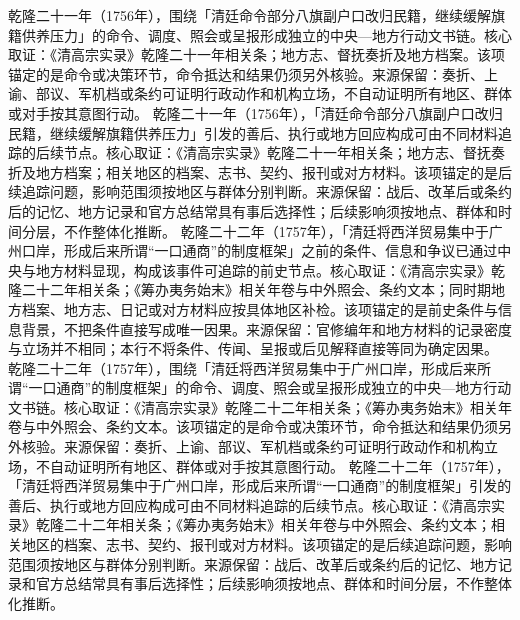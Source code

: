 乾隆二十一年（1756年），围绕「清廷命令部分八旗副户口改归民籍，继续缓解旗籍供养压力」的命令、调度、照会或呈报形成独立的中央—地方行动文书链。核心取证：《清高宗实录》乾隆二十一年相关条；地方志、督抚奏折及地方档案。该项锚定的是命令或决策环节，命令抵达和结果仍须另外核验。来源保留：奏折、上谕、部议、军机档或条约可证明行政动作和机构立场，不自动证明所有地区、群体或对手按其意图行动。
乾隆二十一年（1756年），「清廷命令部分八旗副户口改归民籍，继续缓解旗籍供养压力」引发的善后、执行或地方回应构成可由不同材料追踪的后续节点。核心取证：《清高宗实录》乾隆二十一年相关条；地方志、督抚奏折及地方档案；相关地区的档案、志书、契约、报刊或对方材料。该项锚定的是后续追踪问题，影响范围须按地区与群体分别判断。来源保留：战后、改革后或条约后的记忆、地方记录和官方总结常具有事后选择性；后续影响须按地点、群体和时间分层，不作整体化推断。
乾隆二十二年（1757年），「清廷将西洋贸易集中于广州口岸，形成后来所谓“一口通商”的制度框架」之前的条件、信息和争议已通过中央与地方材料显现，构成该事件可追踪的前史节点。核心取证：《清高宗实录》乾隆二十二年相关条；《筹办夷务始末》相关年卷与中外照会、条约文本；同时期地方档案、地方志、日记或对方材料应按具体地区补检。该项锚定的是前史条件与信息背景，不把条件直接写成唯一因果。来源保留：官修编年和地方材料的记录密度与立场并不相同；本行不将条件、传闻、呈报或后见解释直接等同为确定因果。
乾隆二十二年（1757年），围绕「清廷将西洋贸易集中于广州口岸，形成后来所谓“一口通商”的制度框架」的命令、调度、照会或呈报形成独立的中央—地方行动文书链。核心取证：《清高宗实录》乾隆二十二年相关条；《筹办夷务始末》相关年卷与中外照会、条约文本。该项锚定的是命令或决策环节，命令抵达和结果仍须另外核验。来源保留：奏折、上谕、部议、军机档或条约可证明行政动作和机构立场，不自动证明所有地区、群体或对手按其意图行动。
乾隆二十二年（1757年），「清廷将西洋贸易集中于广州口岸，形成后来所谓“一口通商”的制度框架」引发的善后、执行或地方回应构成可由不同材料追踪的后续节点。核心取证：《清高宗实录》乾隆二十二年相关条；《筹办夷务始末》相关年卷与中外照会、条约文本；相关地区的档案、志书、契约、报刊或对方材料。该项锚定的是后续追踪问题，影响范围须按地区与群体分别判断。来源保留：战后、改革后或条约后的记忆、地方记录和官方总结常具有事后选择性；后续影响须按地点、群体和时间分层，不作整体化推断。
